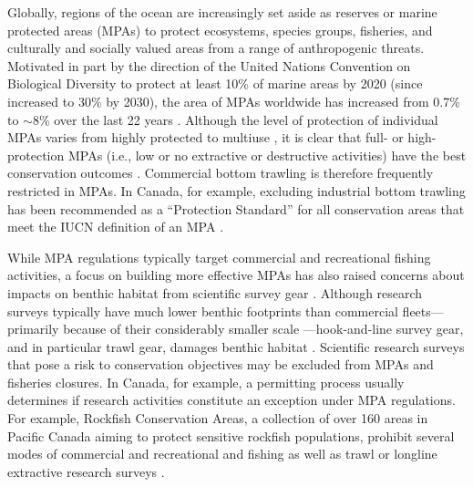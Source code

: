 \documentclass[12pt]{article}
\begin{document}
\begin{spacing}{1.4}
Globally, regions of the ocean are increasingly set aside as reserves or marine protected areas (MPAs) to protect ecosystems, species groups, fisheries, and culturally and socially valued areas from a range of anthropogenic threats. Motivated in part by the direction of the United Nations Convention on Biological Diversity to protect at least 10\% of marine areas by 2020 (since increased to 30\% by 2030), the area of MPAs worldwide has increased from 0.7\% to $\sim$8\% over the last 22 years \citep{WDPA2022}. Although the level of protection of individual MPAs varies from highly protected to multiuse \citep{hortaecosta2016, grorud-colvert2021}, it is clear that full- or high-protection MPAs (i.e., low or no extractive or destructive activities) have the best conservation outcomes \citep[e.g.,][]{lester2008, sciberras2015, edgar2014, zupan2018}. Commercial bottom trawling is therefore frequently restricted in MPAs. In Canada, for example, excluding industrial bottom trawling has been recommended as a ``Protection Standard'' for all conservation areas that meet the IUCN definition of an MPA \citep{dfo2022standards}.

While MPA regulations typically target commercial and recreational fishing activities, a focus on building more effective MPAs has also raised concerns about impacts on benthic habitat from scientific survey gear \citep{field2006, ursgroup2016, saarman2018, benoit2020national}. Although research surveys typically have much lower benthic footprints than commercial fleets---primarily because of their considerably smaller scale \citep{benoit2020national}---hook-and-line survey gear, and in particular trawl gear, damages benthic habitat \citep[e.g.,][]{collie2000a, kaiser2006, hiddink2017}. Scientific research surveys that pose a risk to conservation objectives may be excluded from MPAs and fisheries closures. In Canada, for example, a permitting process usually determines if research activities constitute an exception under MPA regulations. For example, Rockfish Conservation Areas, a collection of over 160 areas in Pacific Canada aiming to protect sensitive rockfish populations, prohibit several modes of commercial and recreational and fishing as well as trawl or longline extractive research surveys \citep{thornborough2020}.


\end{spacing}
\end{document}
